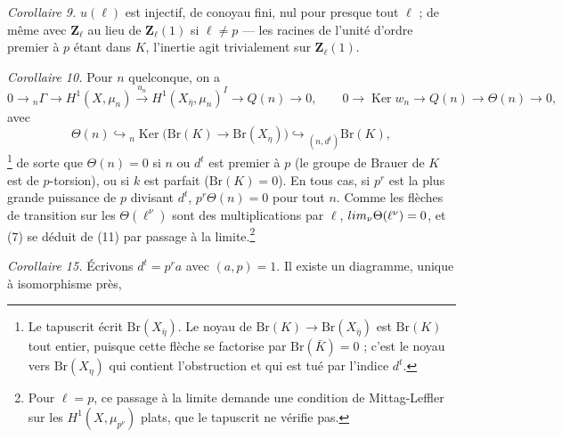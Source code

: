 \documentclass[11pt,a4paper]{article}
\begin{document}
\emph{Corollaire 9.} $u(\ell)$ est injectif, de conoyau fini, nul pour presque
tout $\ell$ ; de même avec $\mathbf{Z}_\ell$ au lieu de $\mathbf{Z}_\ell(1)$ si
$\ell \neq p$ --- les racines de l'unité d'ordre premier à $p$ étant dans $K$,
l'inertie agit trivialement sur $\mathbf{Z}_\ell(1)$.

\emph{Corollaire 10.} Pour $n$ quelconque, on a
\[ 0 \to {}_n\Gamma \to H^1(X, \mu_n) \xrightarrow{u_n} H^1(X_{\bar\eta},
\mu_n)^I \to Q(n) \to 0, \qquad 0 \to \operatorname{Ker} w_n \to Q(n) \to
\Theta(n) \to 0 , \]
avec
\[ \Theta(n) \hookrightarrow {}_n\operatorname{Ker}\bigl(\mathrm{Br}(K) \to
\mathrm{Br}(X_\eta)\bigr) \hookrightarrow {}_{(n, d^t)}\mathrm{Br}(K) ,
\]
\footnote{Le tapuscrit écrit $\mathrm{Br}(X_{\bar\eta})$. Le noyau de
$\mathrm{Br}(K) \to \mathrm{Br}(X_{\bar\eta})$ est $\mathrm{Br}(K)$ tout entier,
puisque cette flèche se factorise par $\mathrm{Br}(\bar K) = 0$ ; c'est le noyau
vers $\mathrm{Br}(X_\eta)$ qui contient l'obstruction et qui est tué par l'indice
$d^t$.} de sorte que $\Theta(n) = 0$ si $n$ ou $d^t$ est premier à $p$ (le groupe
de Brauer de $K$ est de $p$-torsion), ou si $k$ est parfait ($\mathrm{Br}(K) =
0$). En tous cas, si $p^r$ est la plus grande puissance de $p$ divisant $d^t$,
$p^r\Theta(n) = 0$ pour tout $n$. Comme les flèches de transition sur les
$\Theta(\ell^\nu)$ sont des multiplications par $\ell$, $\varprojlim_\nu
\Theta(\ell^\nu) = 0$, et (7) se déduit de (11) par passage à la
limite.\footnote{Pour $\ell = p$, ce passage à la limite demande une condition
de Mittag-Leffler sur les $H^1(X, \mu_{p^\nu})$ plats, que le tapuscrit ne
vérifie pas.}

\emph{Corollaire 15.} Écrivons $d^t = p^ra$ avec $(a, p) = 1$. Il existe un
diagramme, unique à isomorphisme près,

\end{document}
